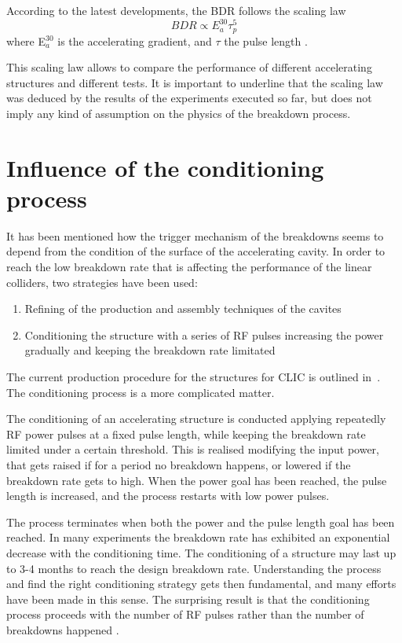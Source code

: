 According to the latest developments, the BDR follows the scaling law
\begin{equation}
BDR \propto E^{30}_a \tau^5_p 
\end{equation}
where E$^{30}_a$ is the accelerating gradient, and $\tau$ the pulse length  \cite{Wuensch:advaces}.

This scaling law allows to compare the performance of different accelerating structures and different tests. It is important to underline that the scaling law was deduced by the results of the experiments executed so far, but does not imply any kind of assumption on the physics of the breakdown process.




\section[Influence of the conditioning process]{Influence of the conditioning process}

It has been mentioned how the trigger mechanism of the breakdowns seems to depend from the condition of the surface of the accelerating cavity. In order to reach the low breakdown rate that is affecting the performance of the linear colliders, two strategies have been used:
\begin{enumerate}
\item Refining of the production and assembly techniques of the cavites
\item Conditioning the structure with a series of RF pulses increasing the power gradually and keeping the breakdown rate limitated
\end{enumerate}
The current production procedure for the structures for CLIC is outlined in~\cite{CLIC:cdr}. The conditioning process is a more complicated matter. 

The conditioning of an accelerating structure is conducted applying repeatedly RF power pulses at a fixed pulse length, while keeping the breakdown rate limited under a certain threshold. This is realised modifying the input power, that gets raised if for a period no breakdown happens, or lowered if the breakdown rate gets to high. When the power goal has been reached, the pulse length is increased, and the process restarts with low power pulses.

The process terminates when both the power and the pulse length goal has been reached. In many experiments the breakdown rate has exhibited an exponential decrease with the conditioning time. The conditioning of a structure may last up to 3-4 months to reach the design breakdown rate. Understanding the process and find the right conditioning strategy gets then fundamental, and many efforts have been made in this sense. The surprising result is that the conditioning process proceeds with the number of RF pulses rather than the number of breakdowns happened \cite{Degiovanni:2065711}.

